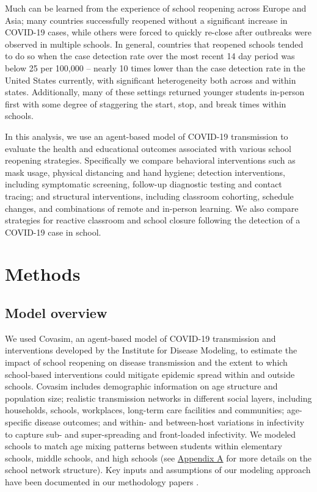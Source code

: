 \documentclass[preprint,12pt]{elsarticle}
\begin{document}
Much can be learned from the experience of school reopening across Europe and Asia; many countries successfully reopened without a significant increase in COVID-19 cases, while others were forced to quickly re-close after outbreaks were observed in multiple schools. In general, countries that reopened schools tended to do so when the case detection rate over the most recent 14 day period was below 25 per 100,000 -- nearly 10 times lower than the case detection rate in the United States currently, with significant heterogeneity both across and within states. Additionally, many of these settings returned younger students in-person first with some degree of staggering the start, stop, and break times within schools.

In this analysis, we use an agent-based model of COVID-19 transmission to %
evaluate the health and educational outcomes associated with various school reopening strategies. Specifically we compare behavioral interventions such as mask usage, physical distancing and hand hygiene; detection interventions, including symptomatic screening, follow-up diagnostic testing and contact tracing; and structural interventions, including classroom cohorting, schedule changes, and combinations of remote and in-person learning. We also compare strategies for reactive classroom and school closure following the detection of a COVID-19 case in school.

\section{Methods}
\subsection{Model overview}
We used Covasim, an agent-based model of COVID-19 transmission and interventions developed by the Institute for Disease Modeling, to estimate the impact of school reopening on disease transmission and the extent to which school-based interventions could mitigate epidemic spread within and outside schools. Covasim includes demographic information on age structure and population size; realistic transmission networks in different social layers, including households, schools, workplaces, long-term care facilities and communities; age-specific disease outcomes; and within- and between-host variations in infectivity to capture sub- and super-spreading and front-loaded infectivity. We modeled schools to match age mixing patterns between students within elementary schools, middle schools, and high schools \cite{guclu_social_2016} (see \hyperref[sec:AppendixA]{Appendix A} for more details on the school network structure). Key inputs and assumptions of our modeling approach have been documented in our methodology papers \cite{kerr_controlling_2020, kerr_covasim_2020}.
\end{document}

